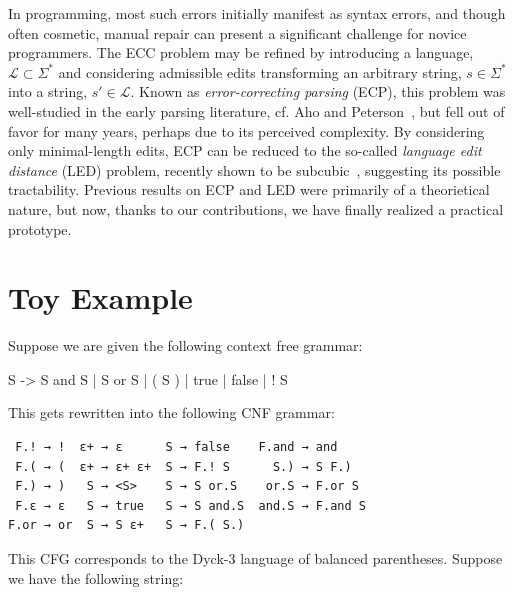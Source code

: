 \documentclass[sigplan,nonacm]{acmart}\settopmatter{printfolios=false,printccs=false,printacmref=false}
\begin{document}
In programming, most such errors initially manifest as syntax errors, and though often cosmetic, manual repair can present a significant challenge for novice programmers. The ECC problem may be refined by introducing a language, $\mathcal{L} \subset \Sigma^*$ and considering admissible edits transforming an arbitrary string, $s \in \Sigma^*$ into a string, $s'\in\mathcal{L}$. Known as \textit{error-correcting parsing} (ECP), this problem was well-studied in the early parsing literature, cf. Aho and Peterson~\cite{aho1972minimum}, but fell out of favor for many years, perhaps due to its perceived complexity. By considering only minimal-length edits, ECP can be reduced to the so-called \textit{language edit distance} (LED) problem, recently shown to be subcubic~\cite{bringmann2019truly}, suggesting its possible tractability. Previous results on ECP and LED were primarily of a theorietical nature, but now, thanks to our contributions, we have finally realized a practical prototype.

%

\section{Toy Example}

Suppose we are given the following context free grammar:

\begin{tidyinput}
S -> S and S | S or S | ( S ) | true | false | ! S
\end{tidyinput}

\noindent This gets rewritten into the following CNF grammar:

\begin{verbatim}
 F.! → !  ε+ → ε      S → false    F.and → and
 F.( → (  ε+ → ε+ ε+  S → F.! S      S.) → S F.)
 F.) → )   S → <S>    S → S or.S    or.S → F.or S
 F.ε → ε   S → true   S → S and.S  and.S → F.and S
F.or → or  S → S ε+   S → F.( S.)
\end{verbatim}

%

\noindent This CFG corresponds to the Dyck-3 language of balanced parentheses. Suppose we have the following string:
\end{document}
